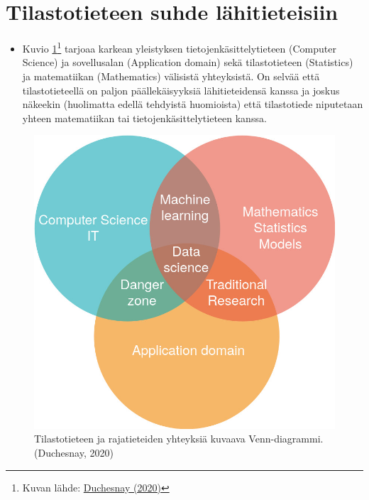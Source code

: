 \documentclass[
]{book}
\providecommand{\tightlist}{%
  \setlength{\itemsep}{0pt}\setlength{\parskip}{0pt}}
\begin{document}
\hypertarget{alaluku33}{%
\section{Tilastotieteen suhde lähitieteisiin}\label{alaluku33}}

\begin{itemize}
\tightlist
\item
  Kuvio \ref{fig:datasc}\footnote{Kuvan lähde: \href{https://duchesnay.github.io/pystatsml/introduction/machine_learning.html}{Duchesnay (2020)}} tarjoaa karkean yleistyksen tietojenkäsittelytieteen (Computer Science) ja sovellusalan (Application domain) sekä tilastotieteen (Statistics) ja matematiikan (Mathematics) välisistä yhteyksistä. On selvää että tilastotieteellä on paljon päällekäisyyksiä lähitieteidensä kanssa ja joskus näkeekin (huolimatta edellä tehdyistä huomioista) että tilastotiede niputetaan yhteen matematiikan tai tietojenkäsittelytieteen kanssa.
\end{itemize}

\begin{figure}

{\centering \includegraphics[width=1\linewidth]{images/data_science} 

}

\caption{Tilastotieteen ja rajatieteiden yhteyksiä kuvaava Venn-diagrammi. (Duchesnay, 2020)}\label{fig:datasc}
\end{figure}
\end{document}
